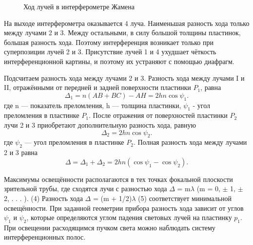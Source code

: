 \documentclass[a4paper, 12pt]{article}%
\begin{document}
	\begin{figure}[H]
		\caption{Ход лучей в интерферометре Жамена}
	\end{figure}
	
	На выходе интерферометра оказывается 4 луча. Наименьшая разность хода только между лучами 2 и 3. Между остальными, в силу большой толщины пластинок, большая разность хода. Поэтому интерференция возникает только при суперпозиции лучей 2 и 3. Присутствие лучей 1 и 4 ухудшает чёткость интерференционной картины, и поэтому их устраняют с помощью диафрагм.
	
	Подсчитаем разность хода между лучами 2 и 3. Разность хода между лучами I и II, отражёнными от передней и задней поверхности пластинки $P_1$, равна
	\begin{equation}
	\Delta_1 = n(AB + BC) - AH = 2hn \cos \psi_1.
	\end{equation}
	где n — показатель преломления, h — толщина пластинки, $\psi_1$ - угол преломления в пластинке $P_1$. После отражения от поверхностей пластинки
	$P_2$ лучи 2 и 3 приобретают дополнительную разность хода, равную
	\begin{equation}
	\Delta_2 = 2hn\cos \psi_2.
	\end{equation} 
	где $\psi_2$ — угол преломления в пластинке $P_2$. Полная разность хода между
	лучами 2 и 3 равна
	\begin{equation}
	\Delta = \Delta_1 + \Delta_2 = 2hn(\cos \psi_1 - \cos \psi_2).
	\end{equation}
	
	Максимумы освещённости располагаются в тех точках
	фокальной плоскости зрительной трубы, где сходятся лучи с разностью
	хода
	$\Delta$ = m$\lambda$ (m = 0, $\pm$ 1, $\pm$ 2, . . . ). (4)
	Разность хода
	$\Delta$ = (m + 1/2)$\lambda$ (5)
	соответствует минимальной освещённости.
	При заданной геометрии прибора разность хода зависит от углов $\psi_1$
	и $\psi_2$, которые определяются углом падения световых лучей на пластинку $p_1$. При освещении расходящимся пучком света можно наблюдать систему интерференционных полос.
	
	
	
	
	
	
	
	
	
	
	
	
	
	
	
	
	
	
	
	
	
	
	
	
	
	
	
	
\end{document}
